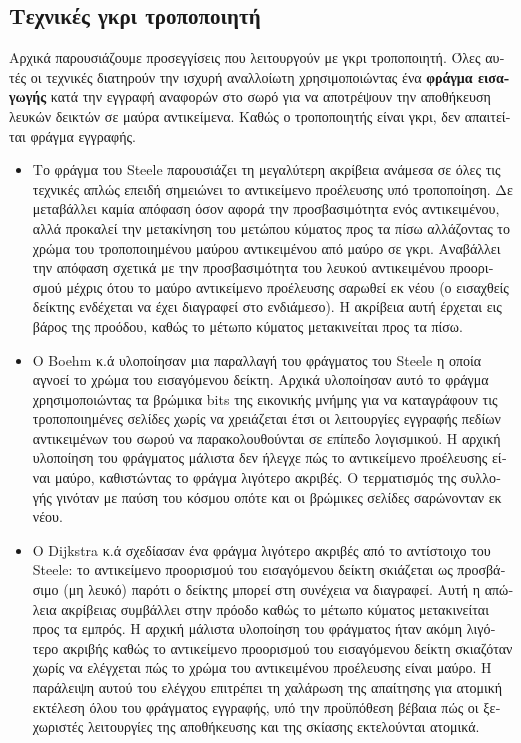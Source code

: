 \begin{greek}
\subsection{Τεχνικές γκρι τροποποιητή}
Αρχικά παρουσιάζουμε προσεγγίσεις που λειτουργούν με γκρι τροποποιητή.
Όλες αυτές οι τεχνικές διατηρούν την ισχυρή αναλλοίωτη χρησιμοποιώντας
ένα \textbf{φράγμα εισαγωγής} κατά την εγγραφή αναφορών στο σωρό για
να αποτρέψουν την αποθήκευση λευκών δεικτών σε μαύρα αντικείμενα.
Καθώς ο τροποποιητής είναι γκρι, δεν απαιτείται φράγμα εγγραφής.

\begin{itemize}
\item Το φράγμα του Steele \cite{DBLP:journals/cacm/Steele75} παρουσιάζει
τη μεγαλύτερη ακρίβεια ανάμεσα σε όλες τις τεχνικές απλώς επειδή
σημειώνει το αντικείμενο προέλευσης υπό τροποποίηση. Δε μεταβάλλει
καμία απόφαση όσον αφορά την προσβασιμότητα ενός αντικειμένου, αλλά
προκαλεί την μετακίνηση του μετώπου κύματος προς τα πίσω αλλάζοντας
το χρώμα του τροποποιημένου μαύρου αντικειμένου από μαύρο σε γκρι.
Αναβάλλει την απόφαση σχετικά με την προσβασιμότητα του λευκού
αντικειμένου προορισμού μέχρις ότου το μαύρο αντικείμενο προέλευσης
σαρωθεί εκ νέου (ο εισαχθείς δείκτης ενδέχεται να έχει διαγραφεί
στο ενδιάμεσο). Η ακρίβεια αυτή έρχεται εις βάρος της προόδου,
καθώς το μέτωπο κύματος μετακινείται προς τα πίσω.

\item Ο Boehm κ.ά \cite{DBLP:conf/pldi/BoehmDS91} υλοποίησαν μια
παραλλαγή του φράγματος του Steele η οποία αγνοεί το χρώμα του
εισαγόμενου δείκτη. Αρχικά υλοποίησαν αυτό το φράγμα χρησιμοποιώντας
τα βρώμικα bits της εικονικής μνήμης για να καταγράφουν τις
τροποποιημένες σελίδες χωρίς να χρειάζεται έτσι οι λειτουργίες
εγγραφής πεδίων αντικειμένων του σωρού να παρακολουθούνται σε επίπεδο
λογισμικού. Η αρχική υλοποίηση του φράγματος μάλιστα δεν ήλεγχε
πώς το αντικείμενο προέλευσης είναι μαύρο, καθιστώντας το φράγμα
λιγότερο ακριβές. Ο τερματισμός της συλλογής γινόταν με παύση
του κόσμου οπότε και οι βρώμικες σελίδες σαρώνονταν εκ νέου.

\item Ο Dijkstra κ.ά \cite{DBLP:conf/ac/DijkstraLMSS75,
DBLP:journals/cacm/DijkstraLMSS78} σχεδίασαν ένα φράγμα λιγότερο
ακριβές από το αντίστοιχο του Steele: το αντικείμενο προορισμού
του εισαγόμενου δείκτη σκιάζεται ως προσβάσιμο (μη λευκό) παρότι
ο δείκτης μπορεί στη συνέχεια να διαγραφεί. Αυτή η απώλεια
ακρίβειας συμβάλλει στην πρόοδο καθώς το μέτωπο κύματος
μετακινείται προς τα εμπρός. Η αρχική μάλιστα υλοποίηση του
φράγματος ήταν ακόμη λιγότερο ακριβής καθώς το αντικείμενο
προορισμού του εισαγόμενου δείκτη σκιαζόταν χωρίς να ελέγχεται
πώς το χρώμα του αντικειμένου προέλευσης είναι μαύρο. Η παράλειψη
αυτού του ελέγχου επιτρέπει τη χαλάρωση της απαίτησης για ατομική
εκτέλεση όλου του φράγματος εγγραφής, υπό την προϋπόθεση βέβαια
πώς οι ξεχωριστές λειτουργίες της αποθήκευσης και της σκίασης
εκτελούνται ατομικά.
\end{itemize}


\end{greek}
